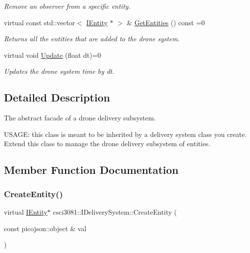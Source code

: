 \begin{DoxyCompactItemize}
\begin{DoxyCompactList}\small\item\em Remove an observer from a specific entity. \end{DoxyCompactList}\item 
\mbox{\label{classcsci3081_1_1IDeliverySystem_aca4e7e3e9a9a19ca87f788935b882277}} 
virtual const std\+::vector$<$ \hyperlink{classentity__project_1_1IEntity}{I\+Entity} $\ast$ $>$ \& \hyperlink{classcsci3081_1_1IDeliverySystem_aca4e7e3e9a9a19ca87f788935b882277}{Get\+Entities} () const =0
\begin{DoxyCompactList}\small\item\em Returns all the entities that are added to the drone system. \end{DoxyCompactList}\item 
\mbox{\label{classcsci3081_1_1IDeliverySystem_a3ef0dda19a6e1ad322bb6dd35ae3e3f1}} 
virtual void \hyperlink{classcsci3081_1_1IDeliverySystem_a3ef0dda19a6e1ad322bb6dd35ae3e3f1}{Update} (float dt)=0
\begin{DoxyCompactList}\small\item\em Updates the drone system time by dt. \end{DoxyCompactList}\end{DoxyCompactItemize}


\subsection{Detailed Description}
The abstract facade of a drone delivery subsystem. 

U\+S\+A\+GE\+: this class is meant to be inherited by a delivery system class you create. Extend this class to manage the drone delivery subsystem of entities. 

\subsection{Member Function Documentation}
\mbox{\label{classcsci3081_1_1IDeliverySystem_abc1959b16d1fcfdeea2a2d8af0733301}} 
\subsubsection{\texorpdfstring{Create\+Entity()}{CreateEntity()}}
{\footnotesize\ttfamily virtual \hyperlink{classentity__project_1_1IEntity}{I\+Entity}$\ast$ csci3081\+::\+I\+Delivery\+System\+::\+Create\+Entity (\begin{DoxyParamCaption}\item[{const picojson\+::object \&}]{val }\end{DoxyParamCaption})\hspace{0.3cm}{\ttfamily [pure virtual]}}



